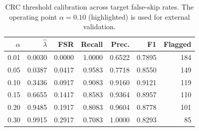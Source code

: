 \begin{table}[htbp]
\centering
\caption{CRC threshold calibration across target false-skip rates. The operating point $\alpha = 0.10$ (highlighted) is used for external validation.}
\label{tab:crc_thresholds}
\small
\begin{tabular}{rrrrrrr}
\toprule
$\alpha$ & $\hat{\lambda}$ & FSR & Recall & Prec. & F1 & Flagged \\
\midrule
0.01 & 0.0030 & 0.0000 & 1.0000 & 0.6522 & 0.7895 & 184 \\
0.05 & 0.0387 & 0.0417 & 0.9583 & 0.7718 & 0.8550 & 149 \\
\rowcolor{blue!8} 0.10 & 0.3436 & 0.0917 & 0.9083 & 0.9160 & 0.9121 & 119 \\
0.15 & 0.6655 & 0.1417 & 0.8583 & 0.9364 & 0.8957 & 110 \\
0.20 & 0.9485 & 0.1917 & 0.8083 & 0.9604 & 0.8778 & 101 \\
0.30 & 0.9915 & 0.2917 & 0.7083 & 1.0000 & 0.8293 & 85 \\
\bottomrule
\end{tabular}
\end{table}